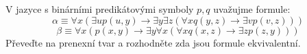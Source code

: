 V jazyce s binárními predikátovými symboly $p,q$ uvažujme formule: 
$$\alpha \equiv \forall x (\exists u p(u,y) \rightarrow \exists y \exists
z(\forall x q(y,z) \rightarrow \exists v p(v,z)))$$
$$\beta \equiv \forall x (p(x,y) \rightarrow \exists y \forall x(\forall x
q(x,z) \rightarrow \exists z p(z,y)))$$
Převeďte na prenexní tvar a rozhodněte zda jsou formule ekvivalentní.
